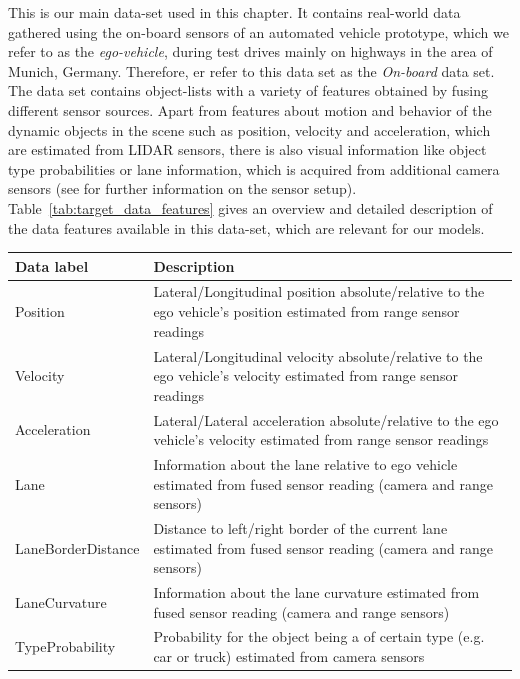 This is our main data-set used in this chapter.
It contains real-world data gathered using the on-board sensors of an automated vehicle prototype, which we refer to as the \emph{ego-vehicle}, during test drives mainly on highways in the area of Munich, Germany.
Therefore, er refer to this data set as the \emph{On-board} data set.
The data set contains object-lists with a variety of features obtained by fusing different sensor sources.
Apart from features about motion and behavior of the dynamic objects in the scene such as position, velocity and acceleration, which are estimated from \ac{LIDAR} sensors, there is also visual information like object type probabilities or lane information, which is acquired from additional camera sensors (see \cite{Aeberhard2015} for further information on the sensor setup).
Table~\ref{tab:target_data_features} gives an overview and detailed description of the data features available in this data-set, which are relevant for our models.
\begin{center}
	\begin{tabular}{|l | p{12cm}|}
		\hline
		\textbf{Data label} & \textbf{Description}\\ \hline
		Position & Lateral/Longitudinal position absolute/relative to the ego vehicle's position estimated from range sensor readings \\ \hline
		Velocity& Lateral/Longitudinal velocity absolute/relative to the ego vehicle's velocity estimated from range sensor readings \\ \hline
		Acceleration & Lateral/Lateral acceleration absolute/relative to the ego vehicle's velocity estimated from range sensor readings \\ \hline
		Lane & Information about the lane relative to ego vehicle estimated from fused sensor reading (camera and range sensors) \\ \hline
		LaneBorderDistance & Distance to left/right border of the current lane estimated from fused sensor reading (camera and range sensors) \\ \hline
		LaneCurvature & Information about the lane curvature estimated from fused sensor reading (camera and range sensors) \\ \hline
		TypeProbability & Probability for the object being a of certain type (e.g. car or truck) estimated from camera sensors \\ \hline
	\end{tabular}
	\label{tab:target_data_features}
\end{center}
